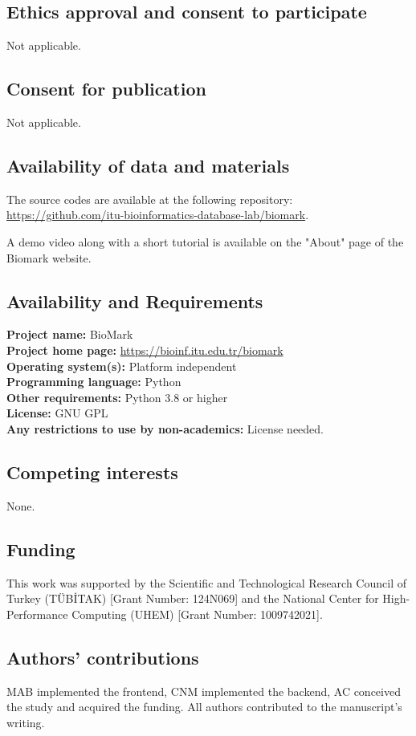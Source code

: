 \documentclass[journal]{IEEEtran}
\begin{document}
\subsection{Ethics approval and consent to participate}
\noindent Not applicable.
\subsection{Consent for publication}
\noindent Not applicable.
\subsection{Availability of data and materials}
\noindent The source codes are available at the following repository: \href{https://github.com/itu-bioinformatics-database-lab/biomark}{https://github.com/itu-bioinformatics-database-lab/biomark}.

\noindent A demo video along with a short tutorial is available on the "About" page of the Biomark website.

\subsection{Availability and Requirements}
\noindent \textbf{Project name:} BioMark \\
\noindent \textbf{Project home page:} \href{https://bioinf.itu.edu.tr/biomark}{https://bioinf.itu.edu.tr/biomark} \\
\noindent \textbf{Operating system(s):} Platform independent \\
\noindent \textbf{Programming language:} Python \\
\noindent \textbf{Other requirements:} Python 3.8 or higher \\
\noindent \textbf{License:} GNU GPL \\
\noindent \textbf{Any restrictions to use by non-academics:} License needed.

\subsection{Competing interests}
\noindent None.

\subsection{Funding}
\noindent This work was supported by the Scientific and Technological Research Council of Turkey (T\"{U}B\.{I}TAK) [Grant Number: 124N069] and the National Center for High-Performance Computing (UHEM) [Grant Number: 1009742021]. 

\subsection{Authors' contributions}
\noindent MAB implemented the frontend, CNM implemented the backend, AC conceived the study and acquired the funding. All authors contributed to the manuscript's writing.


\ifCLASSOPTIONcaptionsoff
\fi




\end{document}
